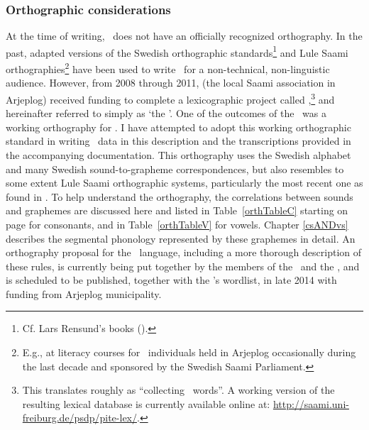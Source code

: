 \subsubsection{Orthographic considerations}\label{orthography}
At the time of writing, \PS\ does not have an officially recognized orthography. In the past, adapted versions of the Swedish orthographic standards\footnote{Cf. Lars Rensund’s books (\citeyear{Rensund1982,Rensund1986}).} 
and Lule Saami orthographies\footnote{E.g., at literacy courses for \PS\ individuals held in Arjeplog occasionally during the last decade and sponsored by the Swedish Saami Parliament.} 
have been used to write \PS\ for a non-technical, non-linguistic audience. However, from 2008 through 2011,  (the local Saami association in Arjeplog) received funding to complete a lexicographic project called ,\footnote{This translates roughly as “collecting \PS\ words”. A working version of the resulting lexical database is currently available online at: \href{http://saami.uni-freiburg.de/psdp/pite-lex/}{http://saami.uni-freiburg.de/psdp/pite-lex/}.} 
\citep[cf.][]{insamlingPS2011} 
and hereinafter referred to simply as ‘the \WLP’. 
One of the outcomes of the \WLP\ was a working orthography for \PS. 
I have attempted to adopt this working orthographic standard in writing \PS\ data in this description and the transcriptions provided in the accompanying documentation. This orthography uses the Swedish alphabet and many Swedish sound-to-grapheme correspondences, but also resembles to some extent Lule Saami orthographic systems, particularly the most recent one as found in \citet{KorhonenO2005}. To help understand the orthography, the correlations between sounds and graphemes are discussed here and listed in Table~\ref{orthTableC} starting on page \pageref{orthTableCbegin} for consonants, and in Table~\vref{orthTableV} for vowels. %
Chapter \ref{csANDvs} describes the segmental phonology represented by these graphemes in detail. 
An orthography proposal for the \PS\ language, including a more thorough description of these rules, is currently being put together by the members of the \WLP\ and the \PSDP, and is scheduled to be published, together with the \WLP’s wordlist, in late 2014 with funding from Arjeplog municipality. 


